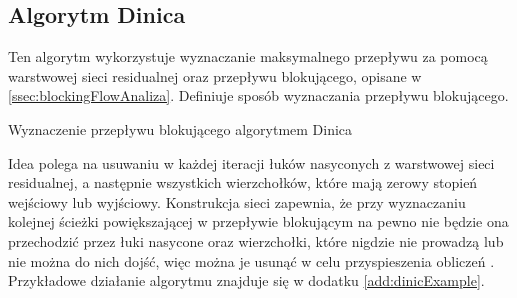 \subsection{Algorytm Dinica}\label{ssec:dinicAnaliza}
Ten algorytm wykorzystuje wyznaczanie maksymalnego przepływu za pomocą warstwowej sieci residualnej oraz przepływu blokującego, opisane w \ref{ssec:blockingFlowAnaliza}. Definiuje sposób wyznaczania przepływu blokującego.
\begin{algorithm}[H]
	\caption{Wyznaczenie przepływu blokującego algorytmem Dinica}\label{dinicPseudo}
	\begin{algorithmic}
					\EndIf
				\EndFor
			\EndWhile
		\EndProcedure
	\end{algorithmic}
\end{algorithm}\noindent
Idea polega na usuwaniu w każdej iteracji łuków nasyconych z warstwowej sieci residualnej, a następnie wszystkich wierzchołków, które mają zerowy stopień wejściowy lub wyjściowy. Konstrukcja sieci zapewnia, że przy wyznaczaniu kolejnej ścieżki powiększającej w przepływie blokującym na pewno nie będzie ona przechodzić przez łuki nasycone oraz wierzchołki, które nigdzie nie prowadzą lub nie można do nich dojść, więc można je usunąć w celu przyspieszenia obliczeń \cite{id:ZaawansowaneAlgorytmyDinic}. Przykładowe działanie algorytmu znajduje się w dodatku \ref{add:dinicExample}.
